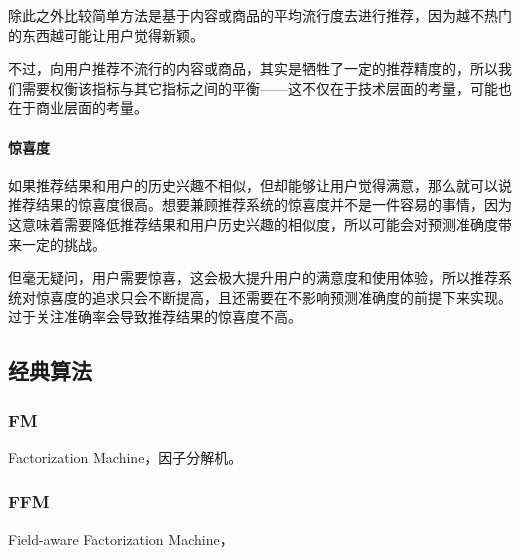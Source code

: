 除此之外比较简单方法是基于内容或商品的平均流行度去进行推荐，因为越不热门的东西越可能让用户觉得新颖。

不过，向用户推荐不流行的内容或商品，其实是牺牲了一定的推荐精度的，所以我们需要权衡该指标与其它指标之间的平衡——这不仅在于技术层面的考量，可能也在于商业层面的考量。

\paragraph{惊喜度}如果推荐结果和用户的历史兴趣不相似，但却能够让用户觉得满意，那么就可以说推荐结果的惊喜度很高。想要兼顾推荐系统的惊喜度并不是一件容易的事情，因为这意味着需要降低推荐结果和用户历史兴趣的相似度，所以可能会对预测准确度带来一定的挑战。

但毫无疑问，用户需要惊喜，这会极大提升用户的满意度和使用体验，所以推荐系统对惊喜度的追求只会不断提高，且还需要在不影响预测准确度的前提下来实现。过于关注准确率会导致推荐结果的惊喜度不高。


\subsection{经典算法}
\subsubsection{FM}
Factorization Machine，因子分解机。

\subsubsection{FFM}
Field-aware Factorization Machine，